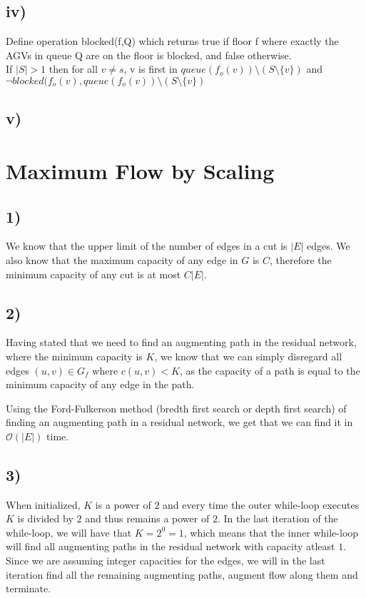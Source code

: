 \documentclass[a4paper]{article}
\begin{document}
\subsection*{iv)}
Define operation blocked(f,Q) which returns true if floor f where exactly the AGVs in queue Q are on the floor is blocked, and false otherwise. \\
If $|S|>1$ then for all $v \neq s$, v is first in $queue(f_o(v))\setminus(S \setminus \{v\})$ and $ \lnot blocked(f_o(v), queue(f_o(v))\setminus(S \setminus \{v\})$
\subsection*{v)}

\section{Maximum Flow by Scaling}
\subsection*{1)}
We know that the upper limit of the number of edges in a cut is $|E|$ edges. We also know that the maximum capacity of any edge in $G$ is $C$, therefore the minimum capacity of any cut is at most $C|E|$.
\subsection*{2)}
Having stated that we need to find an augmenting path in the residual network, where the minimum capacity is $K$, we know that we can simply disregard all edges $(u,v)\in G_f$ where $c(u,v)<K$, as the capacity of a path is equal to the minimum capacity of any edge in the path.

Using the Ford-Fulkerson method (bredth first search or depth first search) of finding an augmenting path in a residual network, we get that we can find it in $\mathcal{O}(|E|)$ time.
\subsection*{3)}
When initialized, $K$ is a power of $2$ and every time the outer while-loop executes $K$ is divided by $2$ and thus remains a power of $2$. In the last iteration of the while-loop, we will have that $K=2^0=1$, which means that the inner while-loop will find all augmenting paths in the residual network with capacity atleast $1$. Since we are assuming integer capacities for the edges, we will in the last iteration find all the remaining augmenting paths, augment flow along them and terminate.
\end{document}
